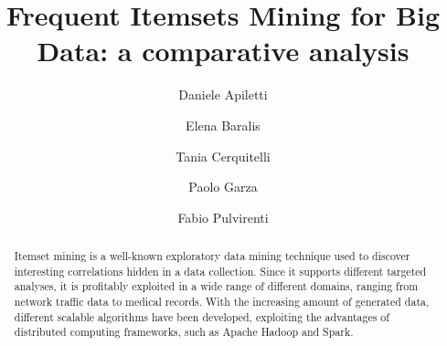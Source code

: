\documentclass[preprint,review,12pt]{elsarticle}
\begin{document}
\begin{frontmatter}




\title{Frequent Itemsets Mining for Big Data: a comparative analysis}


\author{Daniele Apiletti}
\author{Elena Baralis}
\author{Tania Cerquitelli}
\author{Paolo Garza}
\author{Fabio Pulvirenti}


\address{Politecnico di Torino, Dipartimento Automatica e Informatica, Torino, Italy}

\begin{abstract}
Itemset mining is a well-known exploratory data mining technique used to
discover interesting correlations hidden in a data collection. Since it supports
different targeted analyses, it is profitably exploited in a wide range of
different domains, ranging from network traffic data to medical records. With
the increasing amount of generated data, different scalable algorithms have been
developed, exploiting the advantages of distributed computing
frameworks, such as Apache Hadoop and Spark.



\end{abstract}
\end{frontmatter}
\end{document}
